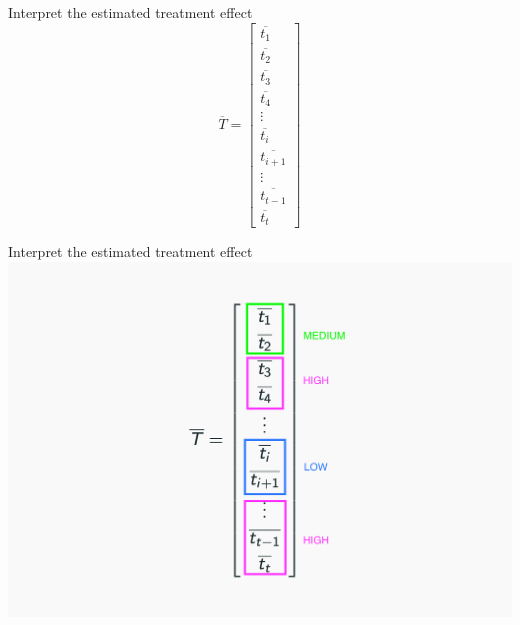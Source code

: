 \documentclass{beamer}
\begin{document}
\begin{frame}{Interpret the estimated treatment effect}
    $$
    \overline{T} = \left[\begin{array}{cccc}
    \overline{t_{1}} \\
    \overline{t_{2}} \\
    \overline{t_{3}} \\
    \overline{t_{4}} \\
    \vdots \\
    \overline{t_{i}} \\
    \overline{t_{i+1}} \\
    \vdots \\
    \overline{t_{t-1}} \\
    \overline{t_{t}}
    \end{array}\right]
    $$
\end{frame}

\begin{frame}{Interpret the estimated treatment effect}
  \centering
  \includegraphics[width=1\textwidth]{images/linear-treatment-hours.png}
\end{frame}


\end{document}
